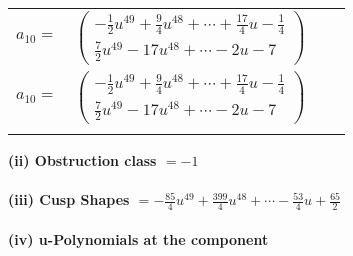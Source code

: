 \documentclass[1p]{elsarticle_modified}
\theoremstyle{definition}
\begin{document}
\begin{tabular}{m{7pt} m{180pt} m{7pt} m{180pt} }
\flushright $a_{10}=$&$\begin{pmatrix}-\frac{1}{2} u^{49}+\frac{9}{4} u^{48}+\cdots+\frac{17}{4} u-\frac{1}{4}\\\frac{7}{2} u^{49}-17 u^{48}+\cdots-2 u-7\end{pmatrix}$\\ \flushright $a_{10}=$&$\begin{pmatrix}-\frac{1}{2} u^{49}+\frac{9}{4} u^{48}+\cdots+\frac{17}{4} u-\frac{1}{4}\\\frac{7}{2} u^{49}-17 u^{48}+\cdots-2 u-7\end{pmatrix}$\\&\end{tabular}
\flushleft \textbf{(ii) Obstruction class $= -1$}\\~\\
\flushleft \textbf{(iii) Cusp Shapes $= -\frac{85}{4} u^{49}+\frac{399}{4} u^{48}+\cdots-\frac{53}{4} u+\frac{65}{2}$}\\~\\
\newpage\renewcommand{\arraystretch}{1}
\flushleft \textbf{(iv) u-Polynomials at the component}\newline \\
\end{document}
